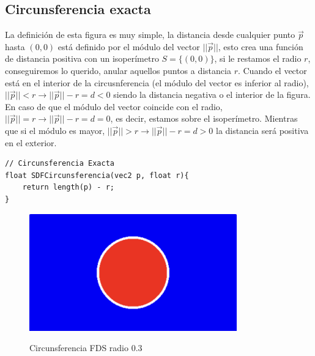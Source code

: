 \subsection{Circunsferencia exacta}
La definición de esta figura es muy simple, la distancia desde cualquier punto \(\Vec{p}\) hasta \((0,0)\) está definido por el módulo del vector \(\vert\vert\Vec{p}\vert\vert\), esto crea una función de distancia positiva con un isoperímetro \(S=\{(0,0)\}\), si le restamos el radio \(r\), conseguiremos lo querido, anular aquellos puntos a distancia \(r\). Cuando el vector está en el interior de la circusnferencia (el módulo del vector es inferior al radio), \(\vert\vert\Vec{p}\vert\vert < r \longrightarrow \vert\vert\Vec{p}\vert\vert - r=d < 0\) siendo la distancia negativa o el interior de la figura. En caso de que el módulo del vector coincide con el radio, \(\vert\vert\Vec{p}\vert\vert = r \longrightarrow \vert\vert\Vec{p}\vert\vert - r=d = 0\), es decir, estamos sobre el isoperímetro. Mientras que si el módulo es mayor, \(\vert\vert\Vec{p}\vert\vert > r \longrightarrow \vert\vert\Vec{p}\vert\vert - r=d > 0\) la distancia será positiva en el exterior.
\begin{lstlisting}
// Circunsferencia Exacta
float SDFCircunsferencia(vec2 p, float r){
    return length(p) - r;
}
\end{lstlisting}
\begin{figure}[H]
  \centering
  \captionsetup{justification=centering}%
  \includegraphics[width=0.8\textwidth]{secciones/imagenes/sdf_circunsferencia.jpeg}\label{fig:circ}
  \caption{Circunsferencia FDS radio \(0.3\)}
\end{figure}

